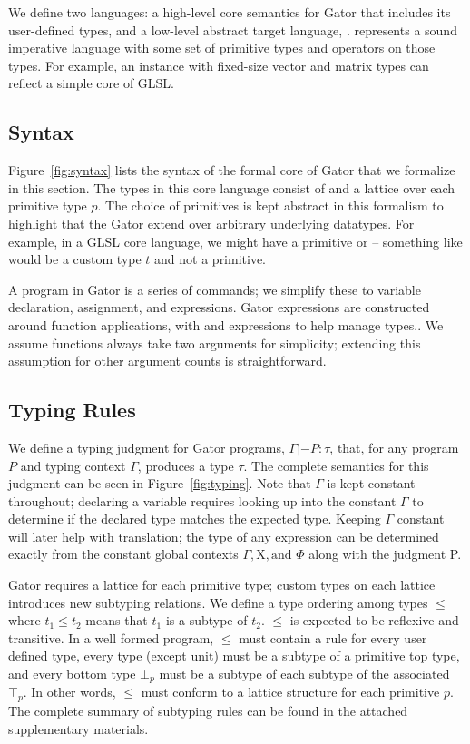 We define two languages: a high-level core semantics for Gator that includes its user-defined types, and a low-level abstract target language, \targlang.  \targlang represents a sound imperative language with some set of primitive types and operators on those types.
For example, an instance with fixed-size vector and matrix types can reflect a simple core of GLSL.

\subsection{Syntax}

Figure~\ref{fig:syntax} lists the syntax of the formal core of Gator that we formalize in this section.
The types in this core language consist of  and a lattice over each primitive type $p$.
The choice of primitives is kept abstract in this formalism to highlight that the Gator extend over arbitrary underlying datatypes.
For example, in a GLSL core language, we might have a primitive  or  -- something like  would be a custom type $t$ and not a primitive.

A program in Gator is a series of commands; we simplify these to variable declaration, assignment, and expressions.
Gator expressions are constructed around function applications, with  and  expressions to help manage types..
We assume functions always take two arguments for simplicity; extending this assumption for other argument counts is straightforward.


\subsection{Typing Rules}
\label{subsec:order}

We define a typing judgment for Gator programs, $\Gamma |- P : \tau$, that, for any program $P$ and typing context $\Gamma$, produces a type $\tau$.  The complete semantics for this judgment can be seen in Figure~\ref{fig:typing}.  
Note that $\Gamma$ is kept constant throughout; declaring a variable requires looking up into the constant $\Gamma$ to determine if the declared type matches the expected type.
Keeping $\Gamma$ constant will later help with translation; the type of any expression can be determined exactly from the constant global contexts $\Gamma,\mathrm{X},\text{and }\Phi$ along with the judgment \textrm{P}.

Gator requires a lattice for each primitive type; custom types on each lattice introduces new subtyping relations.
We define a type ordering among types $\leq$ where $t_1 \leq t_2$ means that $t_1$ is a subtype of $t_2$.
$\leq$ is expected to be reflexive and transitive.
In a well formed program, $\leq$ must contain a rule for every user defined type, every type (except unit) must be a subtype of a primitive top type, and every bottom type $\bot_p$ must be a subtype of each subtype of the associated $\top_p$.
In other words, $\leq$ must conform to a lattice structure for each primitive $p$.
The complete summary of subtyping rules can be found in the attached supplementary materials.

